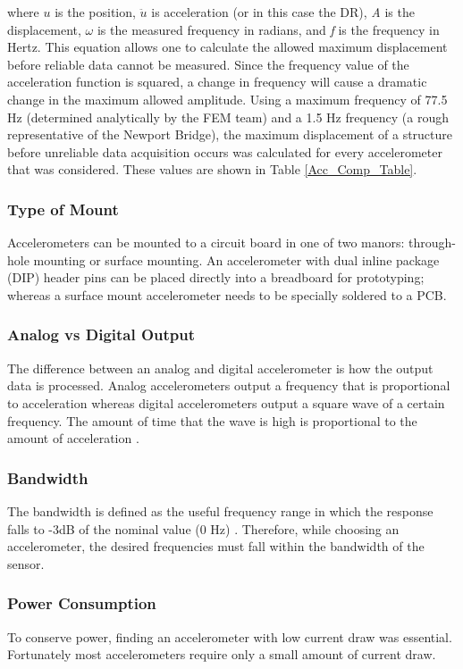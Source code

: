 \noindent where $u$ is the position, $\ddot{u}$ is acceleration (or in this case the DR), \textit{A} is the displacement, $\omega$ is the measured frequency in radians, and \textit{f} is the frequency in Hertz.  This equation allows one to calculate the allowed maximum displacement before reliable data cannot be measured.  Since the frequency value of the acceleration function is squared, a change in frequency will cause a dramatic change in the maximum allowed amplitude.  Using a maximum frequency of 77.5 Hz (determined analytically by the FEM team) and a 1.5 Hz frequency (a rough representative of the Newport Bridge), the maximum displacement of a structure before unreliable data acquisition occurs was calculated for every accelerometer that was considered.  These values are shown in Table \ref{Acc_Comp_Table}.

\subsubsection{Type of Mount}
\indent Accelerometers can be mounted to a circuit board in one of two manors: through-hole mounting or surface mounting.  An accelerometer with dual inline package (DIP) header pins can be placed directly into a breadboard for prototyping; whereas a surface mount accelerometer needs to be specially soldered to a PCB.
\subsubsection{Analog vs Digital Output}
\indent The difference between an analog and digital accelerometer is how the output data is processed.  Analog accelerometers output a frequency that is proportional to acceleration whereas digital accelerometers output a square wave of a certain frequency.  The amount of time that the wave is high is proportional to the amount of acceleration \cite{DimensionEngineering}. 
\subsubsection{Bandwidth}
\indent The bandwidth is defined as the useful frequency range in which the response falls to -3dB of the nominal value (0 Hz) \cite{MSY.SivaPrasad:2011}.  Therefore, while choosing an accelerometer, the desired frequencies must fall within the bandwidth of the sensor.   
\subsubsection{Power Consumption}
\indent To conserve power, finding an accelerometer with low current draw was essential.  Fortunately most accelerometers require only a small amount of current draw.

